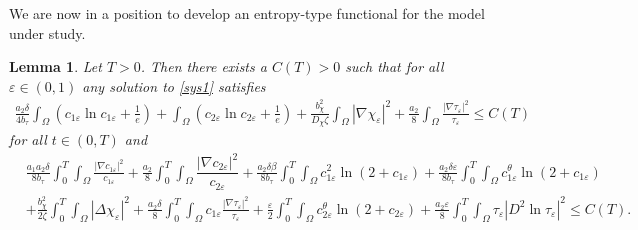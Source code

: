 \documentclass[a4paper,10pt]{article}
\newtheorem{Lemma}[Theorem]{Lemma}
\theoremstyle{definition}
\begin{document}
\noindent
We are now in a position to develop an entropy-type functional for the model under study.
\begin{Lemma}
     \label{entropy_lemma}
      Let $T > 0$. Then there exists a $C(T) > 0$ such that for all $\varepsilon \in (0, 1)$ any solution to \eqref{sys1} satisfies
  \begin{align}
    \label{entropy_main1}
    \frac{a_2 \delta}{4 b_\tau} \int_\Omega \left(c_{1\varepsilon} \ln c_{1\varepsilon} + \tfrac{1}{e}\right) + \int_\Omega \left(c_{2 \varepsilon} \ln c_{2 \varepsilon} + \tfrac{1}{e}\right) + \frac{b_\chi^2}{D_\chi \zeta} \int_\Omega |\nabla \chi_\varepsilon|^2 + \frac{a_2}{8} \int_\Omega \frac{|\nabla \tau_\varepsilon|^2}{\tau_\varepsilon} \leq C(T)
     \end{align}
     for all $t \in (0, T)$ and
    \begin{align}
    \label{entropy_main2}
    \nonumber & \frac{a_1 a_2 \delta}{8 b_\tau} \int_0^T \int_\Omega \frac{|\nabla c_{1\varepsilon}|^2}{c_{1\varepsilon}} + \frac{a_2}{8}  \int_0^T \int_\Omega \dfrac{|\nabla c_{2 \varepsilon}|^2}{c_{2\varepsilon}}+ \frac{a_2 \delta \beta}{8 b_\tau} \int_0^T \int_\Omega c_{1\varepsilon}^2 \ln(2 + c_{1\varepsilon}) + \frac{a_2 \delta \varepsilon}{8 b_\tau} \int_0^T \int_\Omega c_{1\varepsilon}^\theta \ln(2 + c_{1\varepsilon}) \\[5pt]
    &  + \frac{b_\chi^2}{2 \zeta} \int_0^T \int_\Omega |\Delta \chi_\varepsilon|^2  + \frac{a_2 \delta}{8} \int_0^T \int_\Omega c_{1\varepsilon} \frac{|\nabla \tau_\varepsilon|^2}{\tau_\varepsilon}   + \frac{\varepsilon}{2} \int_0^T \int_\Omega c_{2\varepsilon}^\theta \ln(2 + c_{2\varepsilon})  +\frac{a_2 \varepsilon}{8} \int_0^T \int_\Omega \tau_\varepsilon |D^2 \ln \tau_\varepsilon|^2 \leq C(T).
  \end{align}
\end{Lemma}
\end{document}
